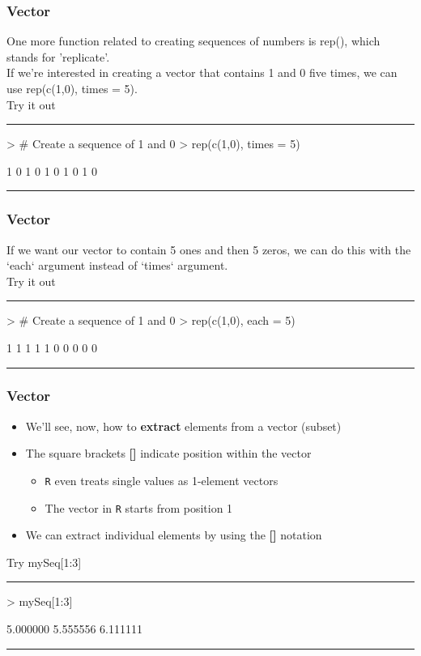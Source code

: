 \documentclass{beamer}
\begin{document}
\begin{frame}[fragile]
	\frametitle{Vector}
	One more function related to creating sequences of numbers is rep(), which stands for 'replicate'.\\
	If we're interested in creating a vector that contains 1 and 0 five times, we can use rep(c(1,0), times = 5).\\
	\centering Try it out
	\pause
	\rule{\textwidth}{0.4pt}
\begin{Schunk}
\begin{Sinput}
> # Create a sequence of 1 and 0
> rep(c(1,0), times = 5)
\end{Sinput}
\begin{Soutput}
 [1] 1 0 1 0 1 0 1 0 1 0
\end{Soutput}
\end{Schunk}
\rule{\textwidth}{0.4pt}
\end{frame}

\begin{frame}[fragile]
	\frametitle{Vector}
If we want our vector to contain 5 ones and then 5 zeros, we can do this with the `each` argument instead of `times` argument.\\
  \centering Try it out\\
  \pause
  \rule{\textwidth}{0.4pt}
\begin{Schunk}
\begin{Sinput}
> # Create a sequence of 1 and 0
> rep(c(1,0), each = 5)
\end{Sinput}
\begin{Soutput}
 [1] 1 1 1 1 1 0 0 0 0 0
\end{Soutput}
\end{Schunk}
\rule{\textwidth}{0.4pt}
\end{frame}

\begin{frame}[fragile]
	\frametitle{Vector}
	\begin{itemize}
	\item We'll see, now, how to \textbf{extract} elements from a vector (subset)
	\item The square brackets \textbf{[]} indicate position within the vector
	  \begin{itemize}
	    \small
	    \item \texttt{R} even treats single values as 1-element vectors
	    \item The vector in \texttt{R} starts from position 1
	  \end{itemize}
	\item We can extract individual elements by using the \textbf{[]} notation
  \end{itemize}
  \centering Try mySeq[1:3]\\
  \pause
  \rule{\textwidth}{0.4pt}
\begin{Schunk}
\begin{Sinput}
> mySeq[1:3]
\end{Sinput}
\begin{Soutput}
[1] 5.000000 5.555556 6.111111
\end{Soutput}
\end{Schunk}
\rule{\textwidth}{0.4pt}
\end{frame}
\end{document}
